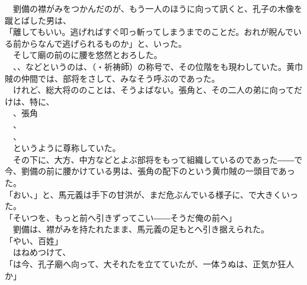\documentclass[
  paper=a5,
  fontsize=10pt,
  jafontsize=9.5pt,
  tate,                  %
  open_bracket_pos=nibu, %
]{jlreq}
\begin{document}
　劉備の襟がみをつかんだのが、もう一人のほうに向って訊くと、孔子の木像を蹴とばした男は、\\


「離してもいい。逃げればすぐ叩っ斬ってしまうまでのことだ。おれが睨んでいる前からなんで逃げられるものか」と、いった。\\


　そして廟の前のに腰を悠然とおろした。\\


　、、などというのは、（・祈祷師）の称号で、その位階をも現わしていた。黄巾賊の仲間では、部将をさして、みなそう呼ぶのであった。\\


　けれど、総大将ののことは、そうよばない。張角と、その二人の弟に向ってだけは、特に、\\


　、張角\\


　、\\


　、\\


　というように尊称していた。\\


　その下に、大方、中方などとよぶ部将をもって組織しているのであった――で今、劉備の前に腰かけている男は、張角の配下のという黄巾賊の一頭目であった。\\


「おい、」と、馬元義は手下の甘洪が、まだ危ぶんでいる様子に、で大きくいった。\\


「そいつを、もっと前へ引きずってこい――そうだ俺の前へ」\\


　劉備は、襟がみを持たれたまま、馬元義の足もとへ引き据えられた。\\


「やい、百姓」\\


　はねめつけて、\\


「は今、孔子廟へ向って、大それたを立てていたが、一体うぬは、正気か狂人か」\\
\end{document}

